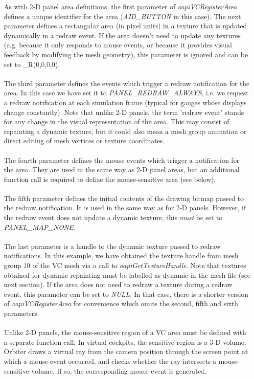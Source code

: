\documentclass[Orbiter Developer Manual.tex]{subfiles}
\begin{document}
\noindent
As with 2-D panel area definitions, the first parameter of \textit{oapiVCRegisterArea} defines a unique identifier for the area (\textit{AID\_BUTTON} in this case). The next parameter defines a rectangular area (in pixel units) in a texture that is updated dynamically in a redraw event. If the area doesn't need to update any textures (e.g. because it only responds to mouse events, or because it provides visual feedback by modifying the mesh geometry), this parameter is ignored and can be set to \_R(0,0,0,0).\\
\\
The third parameter defines the events which trigger a redraw notification for the area. In this case we have set it to \textit{PANEL\_REDRAW\_ALWAYS}, i.e. we request a redraw notification at each simulation frame (typical for gauges whose displays change constantly). Note that unlike 2-D panels, the term 'redraw event' stands for any change in the visual representation of the area. This may consist of repainting a dynamic texture, but it could also mean a mesh group animation or direct editing of mesh vertices or texture coordinates.\\
\\
The fourth parameter defines the mouse events which trigger a notification for the area. They are used in the same way as 2-D panel areas, but an additional function call is required to define the mouse-sensitive area (see below).\\
\\
The fifth parameter defines the initial contents of the drawing bitmap passed to the redraw notification. It is used in the same way as for 2-D panels. However, if the redraw event does not update a dynamic texture, this \textit{must} be set to \textit{PANEL\_MAP\_NONE}.\\
\\
The last parameter is a handle to the dynamic texture passed to redraw notifications. In this example, we have obtained the texture handle from mesh group 10 of the VC mesh via a call to \textit{oapiGetTextureHandle}. Note that textures obtained for dynamic repainting must be labelled as dynamic in the mesh file (see next section). If the area does not need to redraw a texture during a redraw event, this parameter can be set to \textit{NULL}. In that case, there is a shorter version of \textit{oapiVCRegisterArea} for convenience which omits the second, fifth and sixth parameters.\\
\\
Unlike 2-D panels, the mouse-sensitive region of a VC area must be defined with a separate function call. In virtual cockpits, the sensitive region is a 3-D volume. Orbiter draws a virtual ray from the camera position through the screen point at which a mouse event occurred, and checks whether the ray intersects a mouse-sensitive volume. If so, the corresponding mouse event is generated.\\
\end{document}
